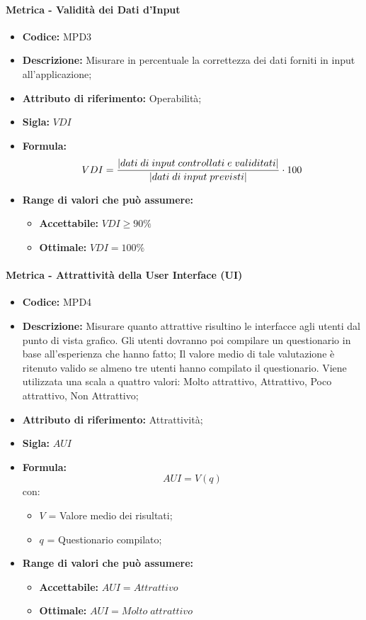 \paragraph{Metrica - Validità dei Dati d'Input} 
\begin{itemize}
    \item \textbf{Codice:} MPD3
    \item \textbf{Descrizione:} Misurare in percentuale la correttezza dei dati forniti in input all'applicazione;
    \item \textbf{Attributo di riferimento:} Operabilità;
    \item \textbf{Sigla:} $VDI$
    \item \textbf{Formula:} $$VDI = {|dati \; di \; input \; controllati \; e \; validitati| \over |dati \; di \; input \; previsti|} \cdot 100$$  
    \item \textbf{Range di valori che può assumere:}
    \begin{itemize}
        \item \textbf{Accettabile:} $VDI \geq 90\%$
        \item \textbf{Ottimale:} $VDI = 100\%$
    \end{itemize}
\end{itemize}

\paragraph{Metrica - Attrattività della User Interface (UI)} 
\begin{itemize}
    \item \textbf{Codice: } MPD4
    \item \textbf{Descrizione:} Misurare quanto attrattive risultino le interfacce agli utenti dal punto di vista grafico.
    Gli utenti dovranno poi compilare un questionario in base all'esperienza che hanno fatto;
    Il valore medio di tale valutazione è ritenuto valido se almeno tre utenti hanno compilato il questionario. 
    Viene utilizzata una scala a quattro valori: Molto attrattivo, Attrattivo, Poco attrattivo, Non Attrattivo;
    \item \textbf{Attributo di riferimento:} Attrattività;
    \item \textbf{Sigla:} $AUI$
    \item \textbf{Formula:}$$AUI = V(q) $$
    con:
        \begin{itemize}
        \item $V$ = Valore medio dei risultati;
        \item $q$ = Questionario compilato;
        \end{itemize}
    \item \textbf{Range di valori che può assumere:}
        \begin{itemize}
            \item \textbf{Accettabile:} $AUI = Attrattivo$ 
            \item \textbf{Ottimale:} $AUI = Molto \; attrattivo$
        \end{itemize}
\end{itemize}

